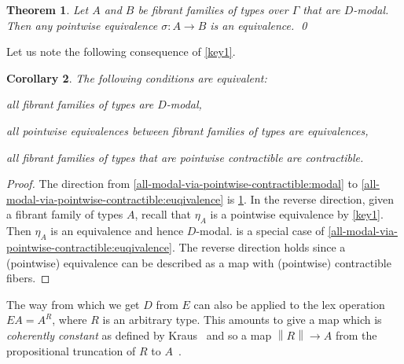 \documentclass[10pt,a4paper,draft]{article}
\def\norm#1{\left\|#1\right\|}
\newcommand{\D}{D}              %
\newcommand{\E}{E}
\renewcommand{\~}{\widetilde}
\newtheorem{theorem}{Theorem}[section]
\newtheorem{corollary}[theorem]{Corollary}
\theoremstyle{definition}
\theoremstyle{remark} %
\begin{document}
\begin{theorem}\label{strict1}
  Let $A$ and $B$ be fibrant families of types over $\Gamma$ that are $\D$\hyp{}modal.
  Then any pointwise equivalence $\sigma : A \to B$ is an equivalence.
\qed
\end{theorem}

Let us note the following consequence of \cref{key1}.

\begin{corollary} \label{all-modal-via-pointwise-contractible}
The following conditions are equivalent:
\begin{conditions}
\item \label{all-modal-via-pointwise-contractible:modal}
all fibrant families of types are $D$-modal,
\item \label{all-modal-via-pointwise-contractible:euqivalence}
all pointwise equivalences between fibrant families of types are equivalences,
\item \label{all-modal-via-pointwise-contractible:contractible}
all fibrant families of types that are pointwise contractible are contractible.
\end{conditions}
\end{corollary}

\begin{proof}
The direction from \cref{all-modal-via-pointwise-contractible:modal} to \cref{all-modal-via-pointwise-contractible:euqivalence} is \cref{strict1}.
In the reverse direction, given a fibrant family of types $A$, recall that $\eta_A$ is a pointwise equivalence by \cref{key1}.
Then $\eta_A$ is an equivalence and hence $D$-modal.
 is a special case of \cref{all-modal-via-pointwise-contractible:euqivalence}.
The reverse direction holds since a (pointwise) equivalence can be described as a map with (pointwise) contractible fibers.
\end{proof}

The way from which we get $\D$ from $\E$ can also be applied to the
lex operation $\E A = A^R$, where $R$ is an arbitrary type.
This amounts to give a map which is {\em coherently constant} as defined by Kraus~\cite{Kraus15}
and so a map $\norm{R}\rightarrow A$ from the propositional truncation
of $R$ to $A$~\cite{Kraus15}.
\end{document}
